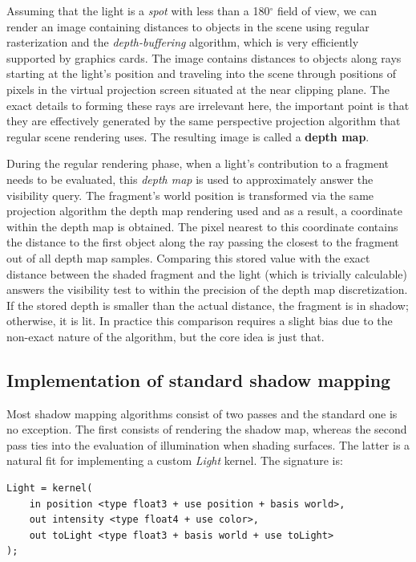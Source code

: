 Assuming that the light is a \emph{spot} with less than a 180$^\circ$ field of view, we can render an image containing distances to objects in the scene using regular rasterization and the \emph{depth-buffering} algorithm, which is very efficiently supported by graphics cards. The image contains distances to objects along rays starting at the light's position and traveling into the scene through positions of pixels in the virtual projection screen situated at the near clipping plane. The exact details to forming these rays are irrelevant here, the important point is that they are effectively generated by the same perspective projection algorithm that regular scene rendering uses. The resulting image is called a \textbf{depth map}.

During the regular rendering phase, when a light's contribution to a fragment needs to be evaluated, this \emph{depth map} is used to approximately answer the visibility query. The fragment's world position is transformed via the same projection algorithm the depth map rendering used and as a result, a coordinate within the depth map is obtained. The pixel nearest to this coordinate contains the distance to the first object along the ray passing the closest to the fragment out of all depth map samples. Comparing this stored value with the exact distance between the shaded fragment and the light (which is trivially calculable) answers the visibility test to within the precision of the depth map discretization. If the stored depth is smaller than the actual distance, the fragment is in shadow; otherwise, it is lit. In practice this comparison requires a slight bias due to the non-exact nature of the algorithm, but the core idea is just that.

\subsection{Implementation of standard shadow mapping}

Most shadow mapping algorithms consist of two passes and the standard one is no exception. The first consists of rendering the shadow map, whereas the second pass ties into the evaluation of illumination when shading surfaces. The latter is a natural fit for implementing a custom \emph{Light} kernel. The signature is:
	
\noindent\begin{minipage}{\textwidth}
\begin{lstlisting}[frame=single]
Light = kernel(
    in position <type float3 + use position + basis world>,
    out intensity <type float4 + use color>,
    out toLight <type float3 + basis world + use toLight>
);
\end{lstlisting}
\end{minipage}

